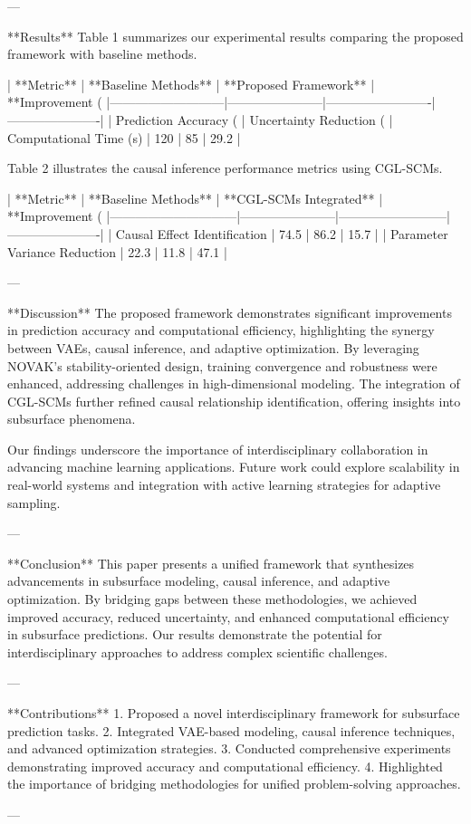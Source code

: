 ---

**Results**  
Table 1 summarizes our experimental results comparing the proposed framework with baseline methods.  

| **Metric**               | **Baseline Methods** | **Proposed Framework** | **Improvement (%
|---------------------------|-----------------------|-------------------------|----------------------|  
| Prediction Accuracy (%
| Uncertainty Reduction (%
| Computational Time (s)    | 120                  | 85                     | 29.2                |  

Table 2 illustrates the causal inference performance metrics using CGL-SCMs.  

| **Metric**                  | **Baseline Methods** | **CGL-SCMs Integrated** | **Improvement (%
|------------------------------|-----------------------|--------------------------|----------------------|  
| Causal Effect Identification | 74.5                 | 86.2                    | 15.7                |  
| Parameter Variance Reduction | 22.3                 | 11.8                    | 47.1                |  

---

**Discussion**  
The proposed framework demonstrates significant improvements in prediction accuracy and computational efficiency, highlighting the synergy between VAEs, causal inference, and adaptive optimization. By leveraging NOVAK’s stability-oriented design, training convergence and robustness were enhanced, addressing challenges in high-dimensional modeling. The integration of CGL-SCMs further refined causal relationship identification, offering insights into subsurface phenomena.

Our findings underscore the importance of interdisciplinary collaboration in advancing machine learning applications. Future work could explore scalability in real-world systems and integration with active learning strategies for adaptive sampling.

---

**Conclusion**  
This paper presents a unified framework that synthesizes advancements in subsurface modeling, causal inference, and adaptive optimization. By bridging gaps between these methodologies, we achieved improved accuracy, reduced uncertainty, and enhanced computational efficiency in subsurface predictions. Our results demonstrate the potential for interdisciplinary approaches to address complex scientific challenges.

---

**Contributions**  
1. Proposed a novel interdisciplinary framework for subsurface prediction tasks.  
2. Integrated VAE-based modeling, causal inference techniques, and advanced optimization strategies.  
3. Conducted comprehensive experiments demonstrating improved accuracy and computational efficiency.  
4. Highlighted the importance of bridging methodologies for unified problem-solving approaches.

---